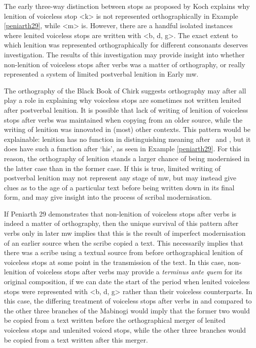  The early three-way distinction between stops as proposed by Koch explains why lenition of voiceless stop <k> is not represented orthographically in Example \ref{peniarth29}, while <m> is. However, there are a handful isolated instances where lenited voiceless stops are written with <b, d, g>. The exact extent to which lenition was represented orthographically for different consonants deserves investigation. The results of this investigation may provide insight into whether non-lenition of voiceless stops after verbs was a matter of orthography, or really represented a system of limited postverbal lenition in Early \gls{mw}.

The orthography of the Black Book of Chirk suggests orthography may after all play a role in explaining why voiceless stops are sometimes not written lenited after postverbal lenition. It is possible that lack of writing of lenition of voiceless stops after verbs was maintained when copying from an older source, while the writing of lenition was innovated in (most) other contexts. This pattern would be explainable: lenition has no function in distinguishing meaning after \ei\ and \oes, but it does have such a function after  `his', as seen in Example \ref{peniarth29}. For this reason, the orthography of lenition stands a larger chance of being modernised in the latter case than in the former case. If this is true, limited writing of postverbal lenition may not represent any stage of \gls{mw}, but may instead give clues as to the age of a particular text before being written down in its final form, and may give insight into the process of scribal modernisation.

 If Peniarth 29 demonstrates that non-lenition of voiceless stops after verbs is indeed a matter of orthography, then the unique survival of this pattern after verbs only in later \gls{mw} implies that this is the result of imperfect modernisation of an earlier source when the scribe copied a text. This necessarily implies that there was a scribe using a textual source from before orthographical lenition of voiceless stops at some point in the transmission of the text. In this case, non-lenition of voiceless stops after verbs may provide a \textit{terminus ante quem} for its original composition, if we can date the start of the period when lenited voiceless stops were represented with <b, d, g> rather than their voiceless counterparts. In this case, the differing treatment of voiceless stops after verbs in  and  compared to the other three branches of the Mabinogi would imply that the former two would be copied from a text written before the orthographical merger of lenited voiceless stops and unlenited voiced stops, while the other three branches would be copied from a text written after this merger. 
 
